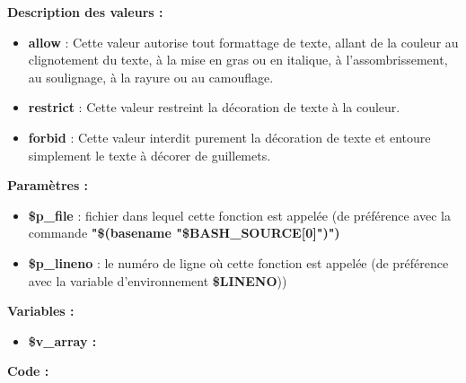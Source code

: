 \documentclass[a4paper,10pt]{article}
\begin{document}
\begin{justify}
    \textbf{Description des valeurs :}

    \begin{itemize}
        \item \textbf{allow} : Cette valeur autorise tout formattage de texte, allant de la couleur au clignotement du texte, à la mise en gras ou en italique, à l'assombrissement, au soulignage, à la rayure ou au camouflage.\\

        \item \textbf{restrict} : Cette valeur restreint la décoration de texte à la couleur.\\

        \item \textbf{forbid} : Cette valeur interdit purement la décoration de texte et entoure simplement le texte à décorer de guillemets.
    \end{itemize}

\end{justify}

\begin{justify}
    \textbf{Paramètres :}

    \begin{itemize}
        \item \color{orange}\textbf{\$p\_file}\color{white} : fichier dans lequel cette fonction est appelée (de préférence avec la commande \textbf{"\$(\color{gray}basename \color{white}"\color{orange}\$BASH\_SOURCE[0]\color{white}")")}\\

        \item \color{orange}\textbf{\$p\_lineno}\color{white} : le numéro de ligne où cette fonction est appelée (de préférence avec la variable d'environnement \textbf{\color{orange}\$LINENO}))
    \end{itemize}
\end{justify}

\begin{justify}
    \textbf{Variables :}

    \begin{itemize}
        \item \textbf{\color{orange}\$v\_array\color{white} :}
    \end{itemize}
\end{justify}

\begin{justify}
    \textbf{Code :}
\end{justify}
\end{document}
